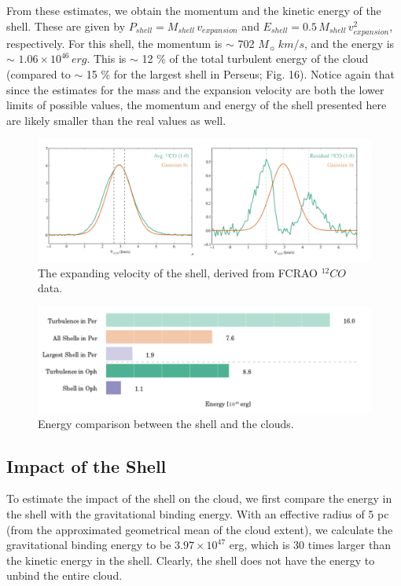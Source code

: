 \documentclass[11pt,a4paper]{emulateapj}
\begin{document}
From these estimates, we obtain the momentum and the kinetic energy of the shell. These are given by $P_{shell} = M_{shell}\,v_{expansion}$ and $E_{shell} = 0.5\,M_{shell}\,v^2_{expansion}$, respectively. For this shell, the momentum is $\sim$ 702 $M_{\sun}\,km/s$, and the energy is $\sim$ $1.06\times10^{46}\,erg$. This is $\sim$ 12 \% of the total turbulent energy of the cloud (compared to $\sim$ 15 \% for the largest shell in Perseus; Fig. 16). Notice again that since the estimates for the mass and the expansion velocity are both the lower limits of possible values, the momentum and energy of the shell presented here are likely smaller than the real values as well.

\begin{figure}[ht]
\centering
\includegraphics[scale=0.5]{fig/v_exp}
\caption{The expanding velocity of the shell, derived from FCRAO $^{12}CO$ data.
}
\end{figure}

\begin{figure}[hb]
\centering
\includegraphics[scale=0.35]{fig/bar_energy.png}
\caption{Energy comparison between the shell and the clouds.
}
\end{figure}

\subsection{Impact of the Shell}
To estimate the impact of the shell on the cloud, we first compare the energy in the shell with the gravitational binding energy. With an effective radius of 5 pc (from the approximated geometrical mean of the cloud extent), we calculate the gravitational binding energy to be $3.97\times10^{47}$ erg, which is 30 times larger than the kinetic energy in the shell. Clearly, the shell does not have the energy to unbind the entire cloud.
\end{document}
